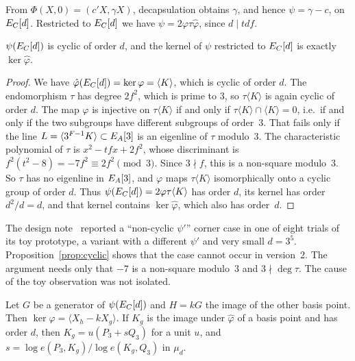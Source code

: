 From $\Phi(X,0)=(c'X,\gamma X)$, decapsulation obtains $\gamma$, and hence
$\psi=\gamma-c$, on $E_C[d]$. Restricted to $E_C[d]$ we have
$\psi=2\varphi\tau\hat\varphi$, since $d\mid tdf$.

\begin{proposition}\label{prop:cyclic}
$\psi(E_C[d])$ is cyclic of order $d$, and the kernel of $\psi$ restricted to
$E_C[d]$ is exactly $\ker\hat\varphi$.
\end{proposition}

\begin{proof}
We have $\hat\varphi(E_C[d])=\ker\varphi=\langle K\rangle$, which is cyclic of
order $d$. The endomorphism $\tau$ has degree $2f^2$, which is prime to $3$,
so $\tau\langle K\rangle$ is again cyclic of order $d$. The map $\varphi$ is
injective on $\tau\langle K\rangle$ if and only if
$\tau\langle K\rangle\cap\langle K\rangle=0$, i.e.\ if and only if the two
subgroups have different subgroups of order~$3$. That fails only if the line
$L=\langle 3^{F-1}K\rangle\subset E_A[3]$ is an eigenline of $\tau$ modulo~3.
The characteristic polynomial of $\tau$ is $x^2-tfx+2f^2$, whose
discriminant is $f^2(t^2-8)=-7f^2\equiv 2f^2\pmod 3$. Since $3\nmid f$, this is
a non-square modulo~3. So $\tau$ has no eigenline in $E_A[3]$, and $\varphi$
maps $\tau\langle K\rangle$ isomorphically onto a cyclic group of order $d$.
Thus $\psi(E_C[d])=2\varphi\tau\langle K\rangle$ has order $d$, its kernel
has order $d^2/d=d$, and that kernel contains $\ker\hat\varphi$, which also
has order~$d$.
\end{proof}

\begin{remark}\label{rem:noncyclic}
The design note~\cite{EigenSetaNote} reported a ``non-cyclic $\psi'$'' corner
case in one of eight trials of its toy prototype, a variant with a different
$\psi'$ and very small $d=3^5$. Proposition~\ref{prop:cyclic} shows that the
case cannot occur in version~2. The argument needs only that $-7$ is a
non-square modulo~3 and $3\nmid\deg\tau$. The cause of the toy observation
was not isolated.
\end{remark}

\begin{proposition}[recovery of $s$]\label{prop:s}
Let $G$ be a generator of $\psi(E_C[d])$ and $H=kG$ the image of the other
basis point. Then $\ker\hat\varphi=\langle X_h-kX_g\rangle$. If $K_g$ is the image
under $\hat\varphi$ of a basis point and has order $d$, then $K_g=u(P_3+sQ_3)$
for a unit $u$, and
$s=\log e(P_3,K_g)/\log e(K_g,Q_3)$ in $\mu_d$.
\end{proposition}

